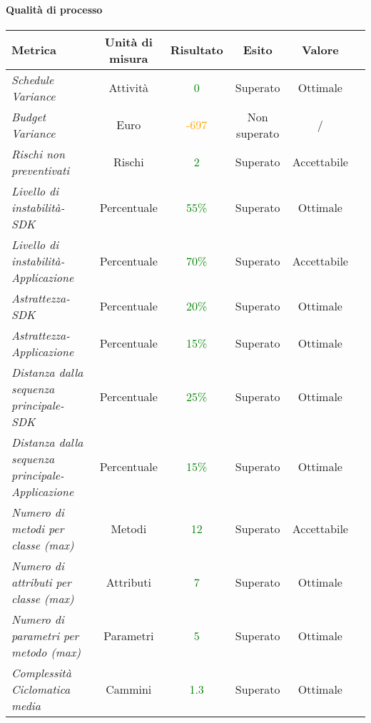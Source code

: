\paragraph{Qualità di processo}
\begin{longtable}{|>{\centering}m{5cm}|c|c|c|c|c|}
\hline
\textbf{Metrica} & \textbf{Unità di misura} & \textbf{Risultato} & \textbf{Esito} & \textbf{Valore}\\
\hline
\endhead

\emph{Schedule Variance} & {Attività} & \textcolor{Green}{0} & Superato & Ottimale\\ \hline
\emph{Budget Variance} & {Euro} & \textcolor{Orange}{-697} & Non superato & /\\ \hline
\emph{Rischi non preventivati} & {Rischi} & \textcolor{Green}{2} & Superato & Accettabile\\ \hline
\emph{Livello di instabilità-SDK} & {Percentuale} &\textcolor{Green}{55\%} & Superato & Ottimale\\ \hline
\emph{Livello di instabilità-Applicazione} & {Percentuale} &\textcolor{Green}{70\%} & Superato & Accettabile\\ \hline
\emph{Astrattezza-SDK} & {Percentuale} & \textcolor{Green}{20\%} & Superato & Ottimale\\ \hline
\emph{Astrattezza-Applicazione} & {Percentuale} &\textcolor{Green}{15\%} & Superato & Ottimale\\ \hline
\emph{Distanza dalla sequenza principale-SDK} & {Percentuale} &\textcolor{Green}{25\%} & Superato & Ottimale\\ \hline
\emph{Distanza dalla sequenza principale-Applicazione} & {Percentuale} &\textcolor{Green}{15\%} & Superato & Ottimale\\ \hline
\emph{Numero di metodi per classe (max)} & {Metodi} & \textcolor{Green}{12} & Superato & Accettabile\\ \hline
\emph{Numero di attributi per classe (max)} & {Attributi} & \textcolor{Green}{7} & Superato & Ottimale\\ \hline
\emph{Numero di parametri per metodo (max)} & {Parametri} & \textcolor{Green}{5} & Superato & Ottimale\\ \hline
\emph{Complessità Ciclomatica media} & {Cammini} & \textcolor{Green}{1.3} & Superato & Ottimale\\ \hline

\end{longtable}
